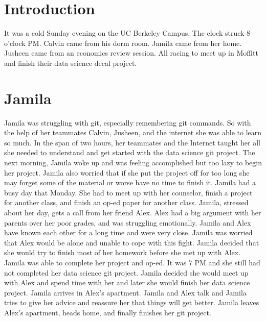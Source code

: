 \documentclass{article}
\begin{document}
\section{Introduction}
It was a cold Sunday evening on the UC Berkeley Campus. The clock struck 8 o'clock PM. Calvin came from his dorm room. Jamila came from her home. Jusheen came from an economics review session. All racing to meet up in Moffitt and finish their data science decal project.

\section{Jamila}
Jamila was struggling with git, especially remembering git commands. So with the help of her teammates Calvin, Jusheen, and the internet she was able to learn so much. In the span of two hours, her teammates and the Internet taught her all she needed to understand and get started with the data science git project. The next morning, Jamila woke up and was feeling accomplished but too lazy to begin her project. Jamila also worried that if she put the project off for too long she may forget some of the material or worse have no time to finish it. Jamila had a busy day that Monday. She had to meet up with her counselor, finish a project for another class, and finish an op-ed paper for another class. Jamila, stressed about her day, gets a call from her friend Alex. Alex had a big argument with her parents over her poor grades, and was struggling emotionally. Jamila and Alex have known each other for a long time and were very close. Jamila was worried that Alex would be alone and unable to cope with this fight. Jamila decided that she would try to finish most of her homework before she met up with Alex. Jamila was able to complete her project and op-ed. It was 7 PM and she still had not completed her data science git project. Jamila decided she would meet up with Alex and spend time with her and later she would finish her data science project. Jamila arrives in Alex’s apartment. Jamila and Alex talk and Jamila tries to give her advice and reassure her that things will get better. Jamila leaves Alex’s apartment, heads home, and finally finishes her git project. 
\end{document}
